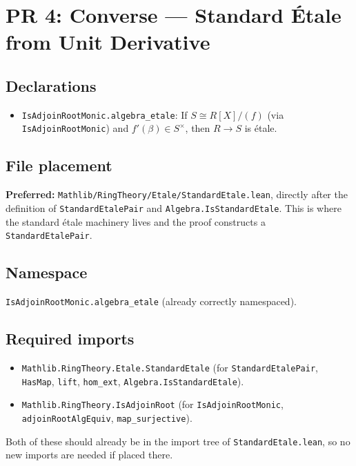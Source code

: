 \section{PR 4: Converse --- Standard \'Etale from Unit Derivative}
\label{sec:pr4}

\subsection*{Declarations}

\begin{itemize}
  \item \texttt{IsAdjoinRootMonic.algebra\_etale}: If $S \cong R[X]/(f)$
    (via \texttt{IsAdjoinRootMonic}) and $f'(\beta) \in S^\times$,
    then $R \to S$ is étale.
\end{itemize}

\subsection*{File placement}

\textbf{Preferred:} \texttt{Mathlib/RingTheory/Etale/StandardEtale.lean},
directly after the definition of \texttt{StandardEtalePair} and
\texttt{Algebra.IsStandardEtale}. This is where the standard étale
machinery lives and the proof constructs a \texttt{StandardEtalePair}.

\subsection*{Namespace}

\texttt{IsAdjoinRootMonic.algebra\_etale} (already correctly namespaced).

\subsection*{Required imports}
\begin{itemize}
  \item \texttt{Mathlib.RingTheory.Etale.StandardEtale}
    (for \texttt{StandardEtalePair}, \texttt{HasMap}, \texttt{lift},
     \texttt{hom\_ext}, \texttt{Algebra.IsStandardEtale}).
  \item \texttt{Mathlib.RingTheory.IsAdjoinRoot}
    (for \texttt{IsAdjoinRootMonic}, \texttt{adjoinRootAlgEquiv},
     \texttt{map\_surjective}).
\end{itemize}

Both of these should already be in the import tree of
\texttt{StandardEtale.lean}, so no new imports are needed if placed there.

